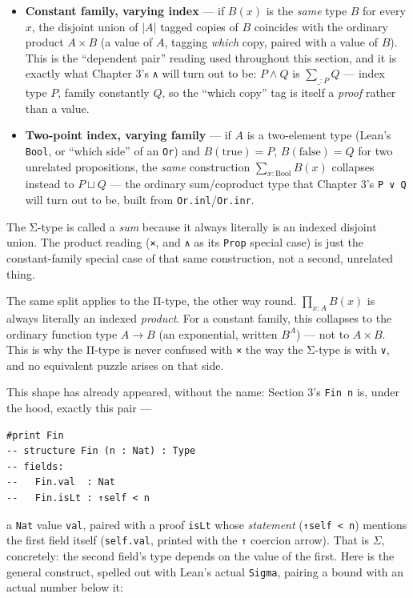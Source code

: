 \begin{itemize}
\tightlist
\item
  \textbf{Constant family, varying index} --- if \(B(x)\) is the \emph{same} type \(B\) for every \(x\), the disjoint union of \(|A|\) tagged copies of \(B\) coincides with the ordinary product \(A \times B\) (a value of \(A\), tagging \emph{which} copy, paired with a value of \(B\)). This is the ``dependent pair'' reading used throughout this section, and it is exactly what Chapter 3's \texttt{∧} will turn out to be: \(P \wedge Q\) is \(\sum_{\_ : P} Q\) --- index type \(P\), family constantly \(Q\), so the ``which copy'' tag is itself a \emph{proof} rather than a value.
\item
  \textbf{Two-point index, varying family} --- if \(A\) is a two-element type (Lean's \texttt{Bool}, or ``which side'' of an \texttt{Or}) and \(B(\mathrm{true}) = P\), \(B(\mathrm{false}) = Q\) for two unrelated propositions, the \emph{same} construction \(\sum_{x:\mathrm{Bool}} B(x)\) collapses instead to \(P \sqcup Q\) --- the ordinary sum/coproduct type that Chapter 3's \texttt{P ∨ Q} will turn out to be, built from \texttt{Or.inl}/\texttt{Or.inr}.
\end{itemize}

The Σ-type is called a \emph{sum} because it always literally is an indexed disjoint union. The product reading (\texttt{×}, and \texttt{∧} as its \texttt{Prop} special case) is just the constant-family special case of that same construction, not a second, unrelated thing.

The same split applies to the Π-type, the other way round. \(\prod_{x:A} B(x)\) is always literally an indexed \emph{product}. For a constant family, this collapses to the ordinary function type \(A \to B\) (an exponential, written \(B^A\)) --- not to \(A \times B\). This is why the Π-type is never confused with \texttt{×} the way the Σ-type is with \texttt{∨}, and no equivalent puzzle arises on that side.

This shape has already appeared, without the name: Section 3's \texttt{Fin n} is, under the hood, exactly this pair ---

\begin{lstlisting}
#print Fin
-- structure Fin (n : Nat) : Type
-- fields:
--   Fin.val  : Nat
--   Fin.isLt : ↑self < n
\end{lstlisting}

a \texttt{Nat} value \texttt{val}, paired with a proof \texttt{isLt} whose \emph{statement} (\texttt{↑self < n}) mentions the first field itself (\texttt{self.val}, printed with the \texttt{↑} coercion arrow). That is \(\Sigma\), concretely: the second field's type depends on the value of the first. Here is the general construct, spelled out with Lean's actual \texttt{Sigma}, pairing a bound with an actual number below it:

